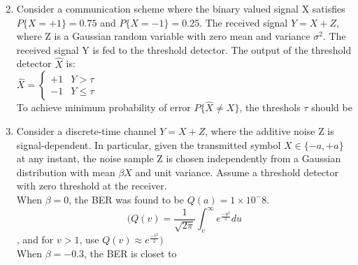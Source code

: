 \documentclass[journal,12pt,twocolumn]{IEEEtran}
\begin{document}
\begin{enumerate}
\begin{enumerate}
\begin{multicols}{2}
\end{multicols}
\end{enumerate}
\solution

\item Consider a communication scheme where the binary valued signal X satisfies $P\{X = +1\} = 0.75$ and $P\{X = -1\} = 0.25$. The received signal $Y = X+Z$, where Z is a Gaussian random variable with zero mean and variance $\sigma^2$. The received signal Y is fed to the threshold detector. The output of the threshold detector $\hat X$ is:\\
{\centering $
{\hat X}= 
\begin{cases} 
+1 & Y> \tau \\
-1 & Y \leqslant \tau 
\end{cases}
$\\}
To achieve minimum probability of error $P\{\hat X \neq X\}$, the threshols $ \tau$ should be

\begin{enumerate}
\end{enumerate}

\item Consider a discrete-time channel $Y = X+Z$, where the additive noise Z is signal-dependent. In particular, given the transmitted symbol $X \in \{-a,+a\}$ at any instant, the noise sample Z is chosen independently from a Gaussian distribution with mean $\beta X$ and unit variance. Assume a threshold detector with zero threshold at the receiver.\\
When $\beta = 0$, the BER was found to be $Q(a) = 1 \times {10^-8}$.\\
$$
\bigg(Q(v)= \dfrac{1}{\sqrt{2 \pi}} \int_{v}^{\infty} e^{\frac{-u^2}{2}}du$$, and for $v>1$, use $Q(v) \approx e^{\frac{-v^2}{2}} \bigg)$ \\
When $\beta = -0.3$, the BER is closet to

\begin{enumerate}
\begin{multicols}{2}
\setlength\itemsep{2em}


\end{multicols}
\end{enumerate}
\end{enumerate}
\end{document}
